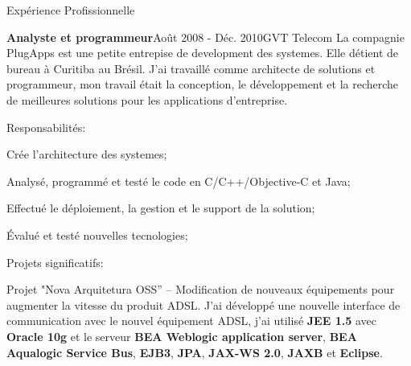 \documentclass{resume}
\begin{document}
\begin{rSection}{Expérience Profissionnelle}
    \begin{rSubsection}{\bf Analyste et programmeur}{Août 2008 - Déc. 2010}{GVT Telecom}{}
      La compagnie PlugApps est une petite entrepise de development des systemes. Elle détient de bureau à Curitiba au Brésil. J'ai travaillé comme architecte de solutions et programmeur, mon travail était la conception, le développement et la recherche de meilleures solutions pour les applications d'entreprise.
    \end{rSubsection}
    \begin{rSubsection}{Responsabilités:}{}{}{}
      \item Crée l’architecture des systemes;
      \item Analysé, programmé et testé le code en C/C++/Objective-C et Java;
      \item Effectué le déploiement, la gestion et le support de la solution;
      \item Évalué et testé nouvelles tecnologies;
    \end{rSubsection}
    \begin{rSubsection}{Projets significatifs:}{}{}{}
    \item Projet "Nova Arquitetura OSS” – Modification de nouveaux équipements pour augmenter la vitesse du produit ADSL. J'ai développé une nouvelle interface de communication avec le nouvel équipement ADSL, j'ai utilisé \textbf{JEE 1.5} avec \textbf{Oracle 10g} et le serveur \textbf{BEA Weblogic application server}, \textbf{BEA Aqualogic Service Bus}, \textbf{EJB3}, \textbf{JPA}, \textbf{JAX-WS 2.0}, \textbf{JAXB} et \textbf{Eclipse}.\\

\end{rSubsection}
\end{rSection}
\end{document}
